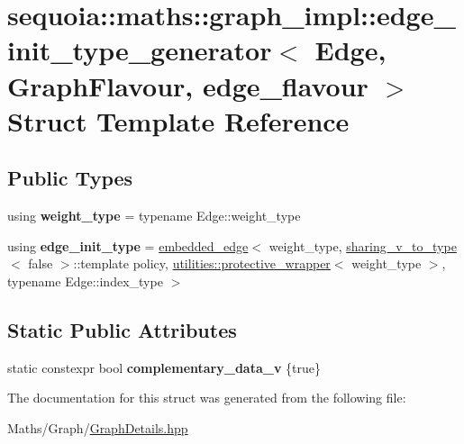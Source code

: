 \hypertarget{structsequoia_1_1maths_1_1graph__impl_1_1edge__init__type__generator}{}\section{sequoia\+::maths\+::graph\+\_\+impl\+::edge\+\_\+init\+\_\+type\+\_\+generator$<$ Edge, Graph\+Flavour, edge\+\_\+flavour $>$ Struct Template Reference}
\label{structsequoia_1_1maths_1_1graph__impl_1_1edge__init__type__generator}
\subsection*{Public Types}
\begin{DoxyCompactItemize}
\item 
\mbox{\label{structsequoia_1_1maths_1_1graph__impl_1_1edge__init__type__generator_ab66469c809b811532681f91500a19b4b}} 
using {\bfseries weight\+\_\+type} = typename Edge\+::weight\+\_\+type
\item 
\mbox{\label{structsequoia_1_1maths_1_1graph__impl_1_1edge__init__type__generator_a9c0b31f6c4a42d704a1eb7cb8f180267}} 
using {\bfseries edge\+\_\+init\+\_\+type} = \mbox{\hyperlink{classsequoia_1_1maths_1_1embedded__edge}{embedded\+\_\+edge}}$<$ weight\+\_\+type, \mbox{\hyperlink{structsequoia_1_1maths_1_1graph__impl_1_1sharing__v__to__type}{sharing\+\_\+v\+\_\+to\+\_\+type}}$<$ false $>$\+::template policy, \mbox{\hyperlink{classsequoia_1_1utilities_1_1protective__wrapper}{utilities\+::protective\+\_\+wrapper}}$<$ weight\+\_\+type $>$, typename Edge\+::index\+\_\+type $>$
\end{DoxyCompactItemize}
\subsection*{Static Public Attributes}
\begin{DoxyCompactItemize}
\item 
\mbox{\label{structsequoia_1_1maths_1_1graph__impl_1_1edge__init__type__generator_a2892dd3b59cea773c6274e1182a863e2}} 
static constexpr bool {\bfseries complementary\+\_\+data\+\_\+v} \{true\}
\end{DoxyCompactItemize}


The documentation for this struct was generated from the following file\+:\begin{DoxyCompactItemize}
\item 
Maths/\+Graph/\mbox{\hyperlink{_graph_details_8hpp}{Graph\+Details.\+hpp}}\end{DoxyCompactItemize}
